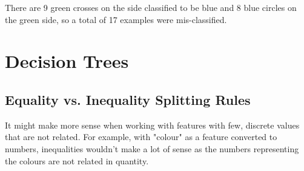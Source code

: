 \documentclass{article}
\begin{document}
There are 9 green crosses on the side classified to be blue and 8 blue circles on the green side, so a total of 17 examples were mis-classified.

\section{Decision Trees}


\subsection{Equality vs. Inequality Splitting Rules}

It might make more sense when working with features with few, discrete values that are not related. For example, with "colour" as a feature converted to numbers, inequalities wouldn't make a lot of sense as the numbers representing the colours are not related in quantity.
\end{document}
